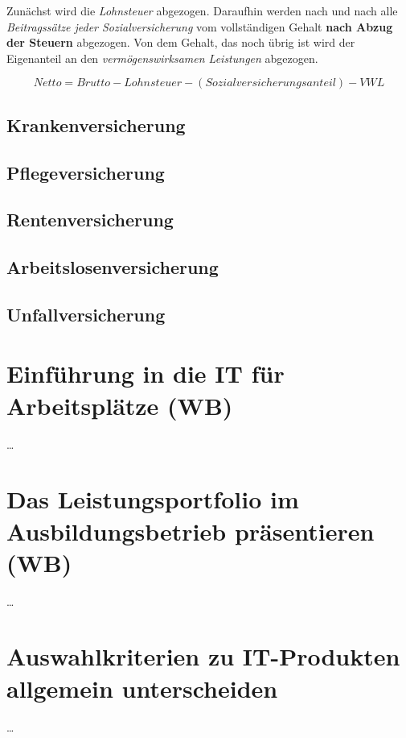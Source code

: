 \documentclass[a4paper, 12pt]{report}
\begin{document}
Zunächst wird die \emph{Lohnsteuer} abgezogen. Daraufhin werden nach und nach 
alle \emph{Beitragssätze jeder Sozialversicherung} vom vollständigen 
Gehalt \textbf{nach Abzug der Steuern} abgezogen. Von dem Gehalt, das noch übrig
ist wird der Eigenanteil an den \emph{vermögenswirksamen Leistungen} abgezogen. 


\begin{center}
    \begin{equation}
        Netto = Brutto - Lohnsteuer - (Sozialversicherungsanteil) - VWL
    \end{equation}
\end{center}

\subsection{Krankenversicherung}

\subsection{Pflegeversicherung}

\subsection{Rentenversicherung}

\subsection{Arbeitslosenversicherung}

\subsection{Unfallversicherung}

\section{Einführung in die IT für Arbeitsplätze (WB)}
\dots

\section{Das Leistungsportfolio im Ausbildungsbetrieb präsentieren (WB)}
\dots

\section{Auswahlkriterien zu IT-Produkten allgemein unterscheiden}
\dots
\end{document}
